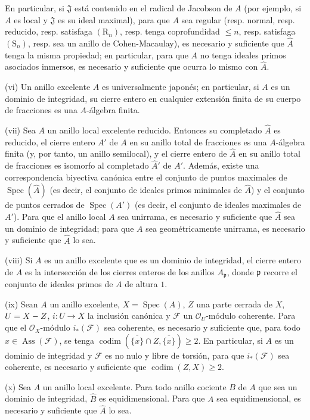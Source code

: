 \begin{scholium}[7.8.3]
En particular, si $\mathfrak J$ está contenido en el radical de Jacobson de
$A$ \textup{(por ejemplo, si $A$ es local y $\mathfrak J$ es su ideal maximal)},
para que $A$ sea regular \textup{(resp.} normal, \textup{resp.} reducido, \textup{resp.} satisfaga
$(\mathrm R_n)$, \textup{resp.} tenga coprofundidad $\leq n$, \textup{resp.} satisfaga
$(\mathrm S_n)$, \textup{resp.} sea un anillo de Cohen-Macaulay), es necesario y
suficiente que $\widehat A$ tenga la misma propiedad; en particular, para
que $A$ no tenga ideales primos asociados inmersos, es necesario y suficiente
que ocurra lo mismo con $\widehat A$.

\textup{(vi)} Un anillo excelente $A$ es universalmente japonés; en particular, si
$A$ es un dominio de integridad, su cierre entero en cualquier extensión
finita de su cuerpo de fracciones es una $A$-álgebra finita.

\textup{(vii)} Sea $A$ un anillo \textup{local} excelente reducido. Entonces su completado
$\widehat A$ es reducido, el cierre entero $A'$ de $A$ en su anillo total
de fracciones es una $A$-álgebra finita \textup{(y, por tanto, un anillo} semilocal),
y el cierre entero de $\widehat A$ en su anillo total de fracciones es
isomorfo al completado $\widehat{A}'$ de $A'$. Además, existe una
correspondencia biyectiva canónica entre el conjunto de puntos maximales de
$\operatorname{Spec}(\widehat A)$ \textup{(es decir, el conjunto de ideales primos}
minimales \textup{de $\widehat A$)} y el conjunto de puntos cerrados de
$\operatorname{Spec}(A')$ \textup{(es decir, el conjunto de ideales} maximales \textup{de
$A'$)}. Para que el anillo local $A$ sea unirrama, es necesario y suficiente
que $\widehat A$ sea un dominio de integridad; para que $A$ sea
geométricamente unirrama, es necesario y suficiente que $\widehat A$ lo sea.

\textup{(viii)} Si $A$ es un anillo excelente que es un dominio de integridad, el
cierre entero de $A$ es la intersección de los cierres enteros de los anillos
$A_{\mathfrak p}$, donde $\mathfrak p$ recorre el conjunto de ideales
primos de $A$ de altura $1$.

\textup{(ix)} Sean $A$ un anillo excelente, $X=\operatorname{Spec}(A)$, $Z$ una parte
cerrada de $X$, $U=X- Z$, $i:U\to X$ la inclusión canónica y $\mathcal F$
un $\mathcal O_U$-módulo coherente. Para que el $\mathcal O_X$-módulo
$i_*(\mathcal F)$ sea coherente, es necesario y suficiente que, para todo
$x\in\operatorname{Ass}(\mathcal F)$, se tenga
$\operatorname{codim}(\overline{\{x\}}\cap Z,\overline{\{x\}})\geq2$.
En particular, si $A$ es un dominio de integridad y $\mathcal F$ es no nulo y libre
de torsión,
para que $i_*(\mathcal F)$ sea coherente, es necesario y suficiente que
$\operatorname{codim}(Z,X)\geq2$.


\textup{(x)} Sea $A$ un anillo local excelente. Para todo anillo cociente $B$ de $A$
que sea un dominio de integridad, $\widehat B$ es equidimensional. Para que
$A$ sea equidimensional, es necesario y suficiente que $\widehat A$ lo sea.
\end{scholium}

